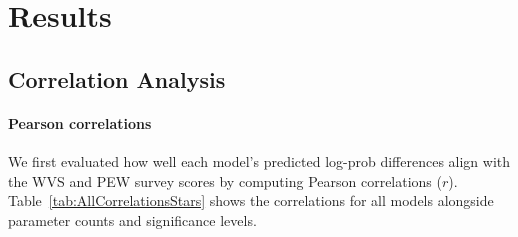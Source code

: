 \documentclass[11pt]{article}
\begin{document}
\section{Results}

\subsection{Correlation Analysis}

\paragraph{Pearson correlations} We first evaluated how well each model’s predicted log-prob differences align with the WVS and PEW survey scores by computing Pearson correlations (\(r\)). Table~\ref{tab:AllCorrelationsStars} shows the correlations for all models alongside parameter counts and significance levels.
\end{document}
